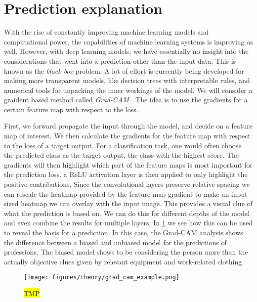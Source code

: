 \section{Prediction explanation}\label{sec:explanation}
With the rise of constantly improving machine learning models and computational
power, the capabilities of machine learning systems is improving as well. However, with deep learning models, we have essentially no insight into the considerations that went into a prediction other than the input data. This is known as the \textit{black box} problem. A lot of effort is currently being developed for making more transparent models, like decision trees with interpretable rules, and numerical tools for unpacking the inner workings of the model. We will consider a graident based method called  \textit{Grad-CAM} \cite{Selvaraju_2019}. The idea is to use the gradients for a certain feature map with respect to the loss. 

First, we forward propagate the input through the model, and decide on a feature map of interest. We then calculate the gradients for the feature map with respect to the loss of a target output. For a classification task, one would often choose the predicted class as the target output, the class with the highest score. The gradients will then highlight which part of the feature maps is most important for the prediction loss. a ReLU activation layer is then applied to only highlight the positive contributions. Since the convolutional layers preserve relative spacing we can rescale the heatmap provided by the feature map gradient to make an input-sized heatmap we can overlay with the input image. This provides a visual clue of what the prediction is based on. We can do this for different depths of the model and even combine the results for
multiple layers. In \cref{fig:grad_cam_example} we see how this can be used to
reveal the basis for a prediction. In this case, the Grad-CAM analysis shows
the difference between a biased and unbiased model for the predictions of professions. The biased model shows to be considering the person more than the actually objective clues given by relevant equipment and work-related clothing


\begin{figure}[H]
  \centering
  \texttt{[image: figures/theory/grad\_cam\_example.png]}
  \caption{\hl{TMP} \cite{Selvaraju_2019} }
  \label{fig:grad_cam_example}
\end{figure}




